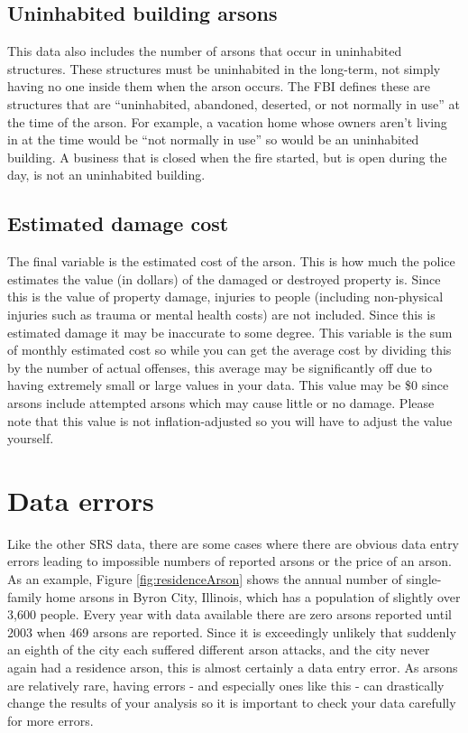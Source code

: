 \documentclass[
]{krantz}
\begin{document}
\subsection{Uninhabited building
arsons}\label{uninhabited-building-arsons}

This data also includes the number of arsons that occur in
uninhabited structures. These structures must be uninhabited
in the long-term, not simply having no one inside them when
the arson occurs. The FBI defines these are structures that
are ``uninhabited, abandoned, deserted, or not normally in
use'' at the time of the arson. For example, a vacation home
whose owners aren't living in at the time would be ``not
normally in use'' so would be an uninhabited building. A
business that is closed when the fire started, but is open
during the day, is not an uninhabited building.

\subsection{Estimated damage
cost}\label{estimated-damage-cost}

The final variable is the estimated cost of the arson. This
is how much the police estimates the value (in dollars) of
the damaged or destroyed property is. Since this is the
value of property damage, injuries to people (including
non-physical injuries such as trauma or mental health costs)
are not included. Since this is estimated damage it may be
inaccurate to some degree. This variable is the sum of
monthly estimated cost so while you can get the average cost
by dividing this by the number of actual offenses, this
average may be significantly off due to having extremely
small or large values in your data. This value may be \$0
since arsons include attempted arsons which may cause little
or no damage. Please note that this value is not
inflation-adjusted so you will have to adjust the value
yourself.

\section{Data errors}\label{data-errors-1}

Like the other SRS data, there are some cases where there
are obvious data entry errors leading to impossible numbers
of reported arsons or the price of an arson. As an example,
Figure \ref{fig:residenceArson} shows the annual number of
single-family home arsons in Byron City, Illinois, which has
a population of slightly over 3,600 people. Every year with
data available there are zero arsons reported until 2003
when 469 arsons are reported. Since it is exceedingly
unlikely that suddenly an eighth of the city each suffered
different arson attacks, and the city never again had a
residence arson, this is almost certainly a data entry
error. As arsons are relatively rare, having errors - and
especially ones like this - can drastically change the
results of your analysis so it is important to check your
data carefully for more errors.
\end{document}
